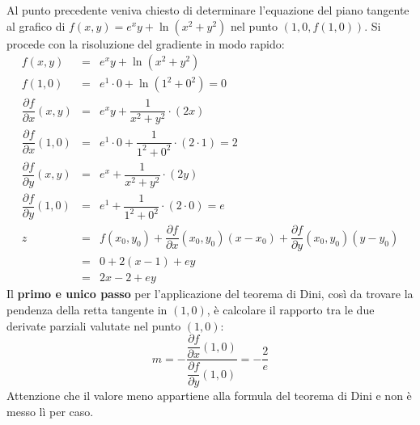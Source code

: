 \documentclass[a4paper]{article}
\begin{document}
	\noindent
	Al punto precedente veniva chiesto di determinare l'equazione del piano tangente al grafico di $f\left(x,y\right) = e^{x}y + \ln\left(x^{2} + y^{2}\right)$ nel punto $\left(1,0,f\left(1,0\right)\right)$. Si procede con la risoluzione del gradiente in modo rapido:\
	\begin{equation*}
		\begin{array}{rcl}
			f\left(x,y\right) &=& e^{x}y + \ln\left(x^{2} + y^{2}\right) \\ [1em]
			f\left(1,0\right) &=& e^{1} \cdot 0 + \ln\left(1^{2} + 0^{2}\right) = 0 \\ [1em]
			\dfrac{\partial f}{\partial x}\left(x,y\right) &=& e^{x}y + \dfrac{1}{x^{2} + y^{2}} \cdot \left(2x\right) \\ [1.5em]
			\dfrac{\partial f}{\partial x}\left(1,0\right) &=& e^{1}\cdot 0 + \dfrac{1}{1^{2} + 0^{2}} \cdot \left(2 \cdot 1\right) = 2 \\ [2em]
			\dfrac{\partial f}{\partial y}\left(x,y\right) &=& e^{x} + \dfrac{1}{x^{2} + y^{2}} \cdot \left(2y\right) \\ [1.5em]
			\dfrac{\partial f}{\partial y}\left(1,0\right) &=& e^{1} + \dfrac{1}{1^{2} + 0^{2}} \cdot \left(2 \cdot 0\right) = e \\ [2em]
			z &=& f\left(x_{0},y_{0}\right) + \dfrac{\partial f}{\partial x}\left(x_{0}, y_{0}\right)\left(x-x_{0}\right) + \dfrac{\partial f}{\partial y}\left(x_{0}, y_{0}\right)\left(y-y_{0}\right) \\ [1em]
			&=& 0 + 2\left(x-1\right) + ey \\
			&=& 2x -2 + ey
		\end{array}
	\end{equation*}
	Il \textbf{primo e unico passo} per l'applicazione del teorema di Dini, così da trovare la pendenza della retta tangente in $\left(1,0\right)$, è calcolare il rapporto tra le due derivate parziali valutate nel punto $\left(1,0\right)$:
	\begin{equation*}
		m = - \dfrac{\dfrac{\partial f}{\partial x}\left(1,0\right)}{\dfrac{\partial f}{\partial y}\left(1,0\right)} = - \dfrac{2}{e}
	\end{equation*}
	Attenzione che il valore meno appartiene alla formula del teorema di Dini e non è messo lì per caso.
\end{document}
